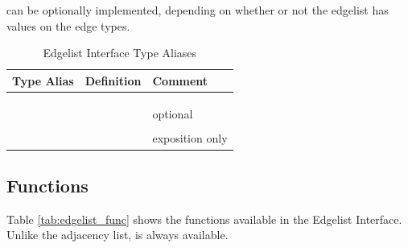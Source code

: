  can be optionally implemented, depending on whether or not the edgelist has values on the edge types.

\begin{table}[h!]
\begin{center}
{\begin{tabular}{l l L{1.7cm}}
\hline
    \textbf{Type Alias} & \textbf{Definition} & \textbf{Comment} \\
\hline
     &  & \\    
     &  & \\    
     &  & \\       
     &  & optional \\
\hline
     &  & \\
    \textit{} &  & exposition only \\
\hline
\end{tabular}}
\caption{Edgelist Interface Type Aliases}
\label{tab:edgelist_type}
\end{center}
\end{table}

%     
\subsection{Functions}
Table \ref{tab:edgelist_func} shows the functions available in the Edgelist Interface. Unlike the adjacency list, 
is always available.


